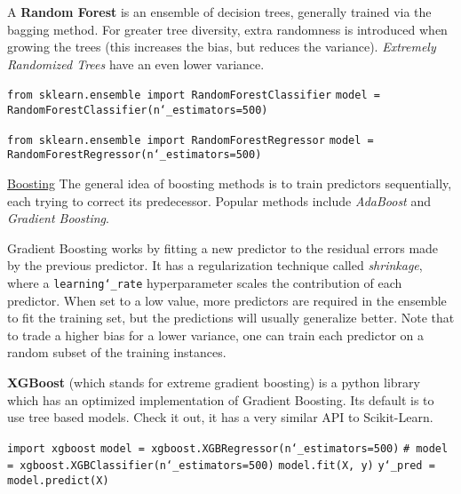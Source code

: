 A \textbf{Random Forest} is an ensemble of decision trees,
generally trained via the bagging method.
For greater tree diversity,
extra randomness is introduced when growing the trees
(this increases the bias, but reduces the variance).
\textit{Extremely Randomized Trees} have an even lower variance.

\texttt{from sklearn.ensemble import RandomForestClassifier}\newline
\texttt{model = RandomForestClassifier(n\char`_estimators=500)}

\texttt{from sklearn.ensemble import RandomForestRegressor}\newline
\texttt{model = RandomForestRegressor(n\char`_estimators=500)}\newline

\underline{Boosting}\newline
The general idea of boosting methods is to train predictors sequentially,
each trying to correct its predecessor.
Popular methods include \textit{AdaBoost} and \textit{Gradient Boosting}.

Gradient Boosting works by fitting a new predictor
to the residual errors made by the previous predictor.
% 
It has a regularization technique called \textit{shrinkage},
where a \texttt{learning\char`_rate} hyperparameter scales the contribution of each predictor.
When set to a low value,
more predictors are required in the ensemble to fit the training set,
but the predictions will usually generalize better.
% 
Note that to trade a higher bias for a lower variance,
one can train each predictor on a random subset of the training instances.

\textbf{XGBoost} (which stands for extreme gradient boosting)
is a python library which has an optimized implementation of Gradient Boosting.
Its default is to use tree based models.
Check it out, it has a very similar API to Scikit-Learn.

\texttt{import xgboost}\newline
\newline
\texttt{model = xgboost.XGBRegressor(n\char`_estimators=500)}\newline
\texttt{\# model = xgboost.XGBClassifier(n\char`_estimators=500)}\newline
\newline
\texttt{model.fit(X, y)}\newline
\texttt{y\char`_pred = model.predict(X)}

\newpage
